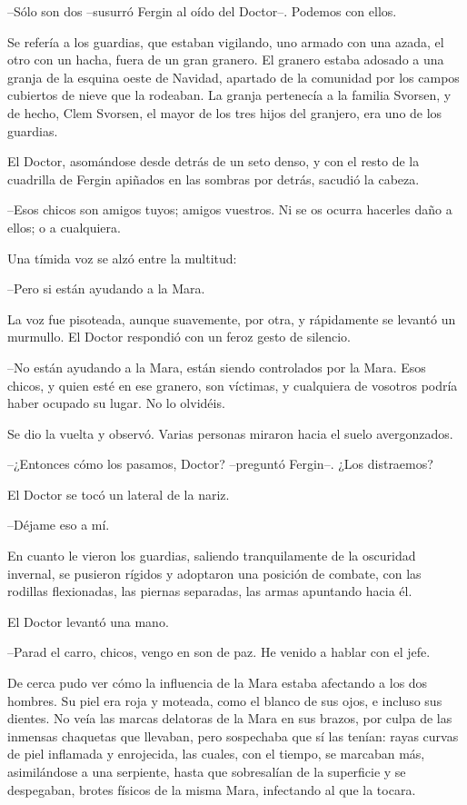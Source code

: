 --Sólo son dos --susurró Fergin al oído del Doctor--. Podemos con ellos.

Se refería a los guardias, que estaban vigilando, uno armado con una azada, el otro con un hacha, fuera de un gran granero. El granero estaba adosado a una granja de la esquina oeste de Navidad, apartado de la comunidad por los campos cubiertos de nieve que la rodeaban. La granja pertenecía a la familia Svorsen, y de hecho, Clem Svorsen, el mayor de los tres hijos del granjero, era uno de los guardias.

El Doctor, asomándose desde detrás de un seto denso, y con el resto de la cuadrilla de Fergin apiñados en las sombras por detrás, sacudió la cabeza.

--Esos chicos son amigos tuyos; amigos vuestros. Ni se os ocurra hacerles daño a ellos; o a cualquiera.

Una tímida voz se alzó entre la multitud:

--Pero si están ayudando a la Mara.

La voz fue pisoteada, aunque suavemente, por otra, y rápidamente se levantó un murmullo. El Doctor respondió con un feroz gesto de silencio.

--No están ayudando a la Mara, están siendo controlados por la Mara. Esos chicos, y quien esté en ese granero, son víctimas, y cualquiera de vosotros podría haber ocupado su lugar. No lo olvidéis.

Se dio la vuelta y observó. Varias personas miraron hacia el suelo avergonzados.

--¿Entonces cómo los pasamos, Doctor? --preguntó Fergin--. ¿Los distraemos?

El Doctor se tocó un lateral de la nariz.

--Déjame eso a mí.



En cuanto le vieron los guardias, saliendo tranquilamente de la oscuridad invernal, se pusieron rígidos y adoptaron una posición de combate, con las rodillas flexionadas, las piernas separadas, las armas apuntando hacia él.

El Doctor levantó una mano.

--Parad el carro, chicos, vengo en son de paz. He venido a hablar con el jefe.

De cerca pudo ver cómo la influencia de la Mara estaba afectando a los dos hombres. Su piel era roja y moteada, como el blanco de sus ojos, e incluso sus dientes. No veía las marcas delatoras de la Mara en sus brazos, por culpa de las inmensas chaquetas que llevaban, pero sospechaba que sí las tenían: rayas curvas de piel inflamada y enrojecida, las cuales, con el tiempo, se marcaban más, asimilándose a una serpiente, hasta que sobresalían de la superficie y se despegaban, brotes físicos de la misma Mara, infectando al que la tocara.

